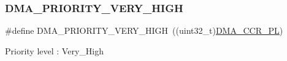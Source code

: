 \subsubsection{\texorpdfstring{D\+M\+A\+\_\+\+P\+R\+I\+O\+R\+I\+T\+Y\+\_\+\+V\+E\+R\+Y\+\_\+\+H\+I\+GH}{DMA\_PRIORITY\_VERY\_HIGH}}
{\footnotesize\ttfamily \#define D\+M\+A\+\_\+\+P\+R\+I\+O\+R\+I\+T\+Y\+\_\+\+V\+E\+R\+Y\+\_\+\+H\+I\+GH~((uint32\+\_\+t)\hyperlink{group___peripheral___registers___bits___definition_ga97726688157629243aa59bb60e33c284}{D\+M\+A\+\_\+\+C\+C\+R\+\_\+\+PL})}

Priority level \+: Very\+\_\+\+High 